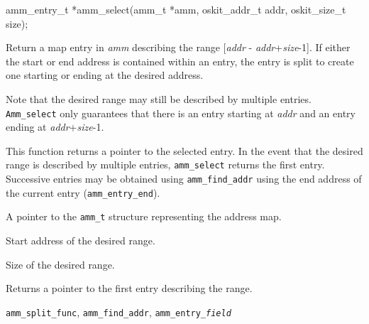 \begin{apisyn}

	\funcproto amm_entry_t *amm_select(amm_t *amm,
			oskit_addr_t addr, oskit_size_t size);
\end{apisyn}
\begin{apidesc}
	Return a map entry in \emph{amm} describing the range
	[\emph{addr} - \emph{addr}+\emph{size}-1].
	If either the start or end address is contained within an entry,
	the entry is split to create one starting or ending at the desired
	address.

	Note that the desired range may still be described by multiple entries.
	{\tt Amm_select} only guarantees that there is an entry starting at
	\emph{addr} and an entry ending at \emph{addr}+\emph{size}-1.

	This function returns a pointer to the selected entry.
	In the event that the desired range is described by multiple entries,
	{\tt amm_select} returns the first entry.
	Successive entries may be obtained using {\tt amm_find_addr} using
	the end address of the current entry ({\tt amm_entry_end}).
\end{apidesc}
\begin{apiparm}
	\item[amm]
		A pointer to the {\tt amm_t} structure
		representing the address map.
	\item[addr]
		Start address of the desired range.
	\item[size]
		Size of the desired range.
\end{apiparm}
\begin{apiret}
	Returns a pointer to the first entry describing the range.
\end{apiret}
\begin{apirel}
	{\tt amm_split_func},
	{\tt amm_find_addr}, {\tt amm_entry_\emph{field}}
\end{apirel}


